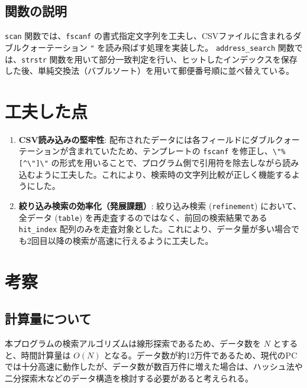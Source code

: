 \documentclass[a4paper,dvipdfmx]{jsarticle}
\begin{document}
\subsection{関数の説明}
\texttt{scan} 関数では、\texttt{fscanf} の書式指定文字列を工夫し、CSVファイルに含まれるダブルクォーテーション \texttt{"} を読み飛ばす処理を実装した。
\texttt{address\_search} 関数では、\texttt{strstr} 関数を用いて部分一致判定を行い、ヒットしたインデックスを保存した後、単純交換法（バブルソート）を用いて郵便番号順に並べ替えている。

\section{工夫した点}
\begin{enumerate}
    \item \textbf{CSV読み込みの堅牢性}: 
    配布されたデータには各フィールドにダブルクォーテーションが含まれていたため、テンプレートの \texttt{fscanf} を修正し、\texttt{\textbackslash"\%[\textasciicircum\textbackslash"]\textbackslash"} の形式を用いることで、プログラム側で引用符を除去しながら読み込むように工夫した。これにより、検索時の文字列比較が正しく機能するようにした。
    
    \item \textbf{絞り込み検索の効率化（発展課題）}:
    絞り込み検索 (\texttt{refinement}) において、全データ (\texttt{table}) を再走査するのではなく、前回の検索結果である \texttt{hit\_index} 配列のみを走査対象とした。これにより、データ量が多い場合でも2回目以降の検索が高速に行えるように工夫した。
\end{enumerate}

\section{考察}
\subsection{計算量について}
本プログラムの検索アルゴリズムは線形探索であるため、データ数を $N$ とすると、時間計算量は $O(N)$ となる。データ数が約12万件であるため、現代のPCでは十分高速に動作したが、データ数が数百万件に増えた場合は、ハッシュ法や二分探索木などのデータ構造を検討する必要があると考えられる。
\end{document}
